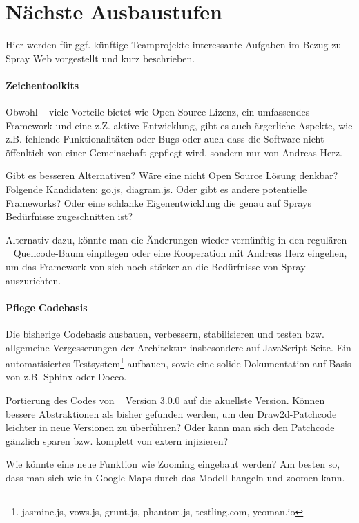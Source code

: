\section{Nächste Ausbaustufen}

Hier werden für ggf. künftige Teamprojekte interessante Aufgaben
im Bezug zu Spray Web vorgestellt und kurz beschrieben.

\paragraph{Zeichentoolkits}

Obwohl \dd~ viele Vorteile bietet wie Open Source Lizenz, ein umfassendes
Framework und eine z.Z. aktive Entwicklung, gibt es auch ärgerliche Aspekte,
wie z.B. fehlende Funktionalitäten oder Bugs oder auch dass die Software
nicht öffenltich von einer Gemeinschaft gepflegt wird, sondern nur von
Andreas Herz.

Gibt es besseren Alternativen? Wäre eine nicht Open Source Lösung denkbar?
Folgende Kandidaten: go.js, diagram.js. Oder gibt es andere potentielle
Frameworks? Oder eine schlanke Eigenentwicklung die genau auf Sprays
Bedürfnisse zugeschnitten ist?

Alternativ dazu, könnte man die Änderungen wieder vernünftig in den regulären
\dd~ Quellcode-Baum einpflegen oder eine Kooperation mit Andreas Herz eingehen,
um das Framework von sich noch stärker an die Bedürfnisse von Spray auszurichten.

\paragraph{Pflege Codebasis}

Die bisherige Codebasis ausbauen, verbessern, stabilisieren und testen bzw.
allgemeine Vergesserungen der Architektur insbesondere auf JavaScript-Seite.
Ein automatisiertes Testsystem\footnote{jasmine.js, vows.js, grunt.js,
phantom.js, testling.com, yeoman.io} aufbauen, sowie eine solide Dokumentation
auf Basis von z.B. Sphinx oder Docco.

Portierung des Codes von \dd~ Version 3.0.0 auf die akuellste Version.
Können bessere Abstraktionen als bisher gefunden werden, um den
Draw2d-Patchcode leichter in neue Versionen zu überführen?
Oder kann man sich den Patchcode gänzlich sparen bzw. komplett von extern
injizieren?

Wie könnte eine neue Funktion wie Zooming eingebaut werden? Am besten so,
dass man sich wie in Google Maps durch das Modell hangeln und zoomen kann.

